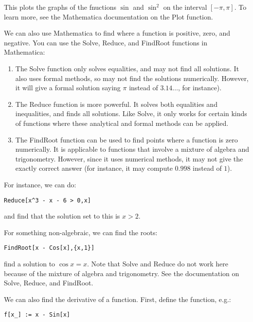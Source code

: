 \documentclass[10pt]{amsart}
\begin{document}
This plots the graphs of the fnuctions $\sin$ and $\sin^2$ on the
interval $[-\pi,\pi]$. To learn more, see the Mathematica
documentation on the Plot function.

We can also use Mathematica to find where a function is positive,
zero, and negative. You can use the Solve, Reduce, and FindRoot
functions in Mathematica:

\begin{enumerate}
\item The Solve function only solves equalities, and may not find all
  solutions. It also uses formal methods, so may not find the
  solutions numerically. However, it will give a formal solution
  saying $\pi$ instead of $3.14 \dots$, for instance).
\item The Reduce function is more powerful. It solves both equalities
  and inequalities, and finds all solutions. Like Solve, it only works
  for certain kinds of functions where these analytical and formal
  methods can be applied.
\item The FindRoot function can be used to find points where a
  function is zero numerically. It is applicable to functions that
  involve a mixture of algebra and trigonometry. However, since it
  uses numerical methods, it may not give the exactly correct answer
  (for instance, it may compute $0.998$ instead of $1$).
\end{enumerate}

For instance, we can do:

\begin{verbatim}
Reduce[x^3 - x - 6 > 0,x]
\end{verbatim}

and find that the solution set to this is $x > 2$.

For something non-algebraic, we can find the roots:

\begin{verbatim}
FindRoot[x - Cos[x],{x,1}]
\end{verbatim}

find a solution to $\cos x = x$. Note that Solve and Reduce do not
work here because of the mixture of algebra and trigonometry. See the
documentation on Solve, Reduce, and FindRoot.

We can also find the derivative of a function. First, define the function, e.g.:

\begin{verbatim}
f[x_] := x - Sin[x]
\end{verbatim}
\end{document}
